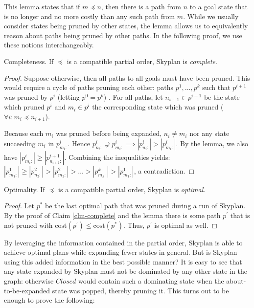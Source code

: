 \documentclass[letterpaper]{article}
\theoremstyle{plain} \newtheorem{theorem}{Theorem} \newtheorem{proposition}{Proposition} \newtheorem{lemma}{Lemma}
\theoremstyle{definition} \newtheorem{definition}{Definition} \newtheorem{conjecture}{Conjecture} \newtheorem*{example}{Example}
\theoremstyle{remark} \newtheorem*{remark}{Remark} \newtheorem*{note}{Note} \newtheorem{case}{Case}
\begin{document}
This lemma states that if $m \preceq n$, then there is a path from $n$ to a goal
state that is no longer and no more costly than any such path from $m$.
While we usually consider states being pruned by other states, the lemma
allows us to equivalently reason about paths being pruned by other paths.
In the following proof, we use these notions interchangeably.


\begin{claim}{Completeness.}\label{clm-complete}
   If $\preceq$ is a compatible partial order, Skyplan
is \emph{complete}.
\end{claim}
\begin{proof}
Suppose otherwise, then all paths to all goals must
have been pruned. This would require a cycle of paths pruning each other: 
paths $p^{1},\dots,p^{k}$ such that $p^{i+1}$ was pruned by $p^{i}$ (letting $p^{0}=p^{k}$) .
For all paths, let $n_{i+1} \in p^{i+1}$ be the state which pruned $p^{i}$ and
$m_{i} \in p^{i}$ the corresponding state which was pruned 
($\forall i: m_{i} \preceq n_{i+1}$).

Because each $m_{i}$ was pruned before being expanded,
$n_{i} \neq m_{i}$ nor any state succeeding $m_{i}$ in $p^{i}_{m_{i}:}$.
Hence $p^{i}_{n_{i}:} \supsetneq p^{i}_{m_{i}:} \implies |p^{i}_{n_{i}:}| > |p^{i}_{m_{i}:}|$.
By the lemma, we also have %
 $|p^{i}_{m_{i}:}| \geq |p^{i+1}_{n_{i+1}:}|$. Combining the
inequalities yields: $|p^{1}_{m_{1}:}| \geq |p^{2}_{n_{2}:}| > |p^{2}_{m_{2}:}| > \dots > |p^{k}_{m_{k}:}| > |p^{1}_{m_{1}:}|$, 
a contradiction.
\end{proof}
  
\begin{claim}{Optimality.}\label{clm-optimal}
   If $\preceq$ is a compatible partial order, Skyplan
is \emph{optimal}.
\end{claim}
\begin{proof} 
Let $p^{*}$ be the last optimal path that was pruned during a run of Skyplan. 
By the proof of Claim \ref{clm-complete} and the lemma 
there is some path $p^\prime$ that is not pruned with
$\mathrm{cost}(p^\prime) \leq \mathrm{cost}(p^{*})$.
Thus, $p^\prime$ is optimal as well.
\end{proof}

By leveraging the information contained in the partial order, Skyplan is able to achieve
optimal plans while expanding fewer states in general.  But is Skyplan using this added
information in the best possible manner? It is easy to see that any state expanded by 
Skyplan must not be dominated by any other state in the graph: otherwise $Closed$ would
contain such a dominating state when the about-to-be-expanded
state was popped, thereby pruning it.  This turns out to be
enough to prove the following:
\end{document}
